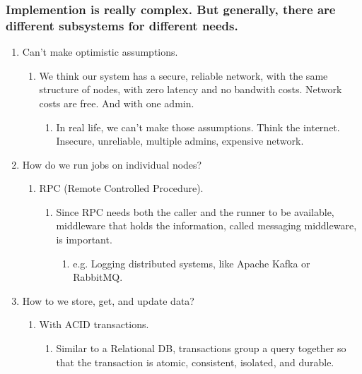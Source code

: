 \documentclass[11pt]{article}
\begin{document}
\subsubsection{Implemention is really complex.  But generally, there are different subsystems for different needs.}
\label{sec-1-1-3}
\begin{enumerate}
\item Can't make optimistic assumptions.
\label{sec-1-1-3-1}
\begin{enumerate}
\item We think our system has a secure, reliable network, with the same structure of nodes, with zero latency and no bandwith costs.  Network costs are free.  And with one admin.
\label{sec-1-1-3-1-1}
\begin{enumerate}
\item In real life, we can't make those assumptions.  Think the internet.  Insecure, unreliable, multiple admins, expensive network.
\label{sec-1-1-3-1-1-1}
\end{enumerate}
\end{enumerate}
\item How do we run jobs on individual nodes?
\label{sec-1-1-3-2}
\begin{enumerate}
\item RPC (Remote Controlled Procedure).
\label{sec-1-1-3-2-1}
\begin{enumerate}
\item Since RPC needs both the caller and the runner to be available, middleware that holds the information, called messaging middleware, is important.
\label{sec-1-1-3-2-1-1}
\begin{enumerate}
\item e.g. Logging distributed systems, like Apache Kafka or RabbitMQ.
\label{sec-1-1-3-2-1-1-1}
\end{enumerate}
\end{enumerate}
\end{enumerate}
\item How to we store, get, and update data?
\label{sec-1-1-3-3}
\begin{enumerate}
\item With ACID transactions.
\label{sec-1-1-3-3-1}
\begin{enumerate}
\item Similar to a Relational DB, transactions group a query together so that the transaction is atomic, consistent, isolated, and durable.
\label{sec-1-1-3-3-1-1}
\end{enumerate}
\end{enumerate}

\end{enumerate}
\end{document}
